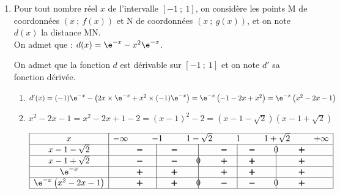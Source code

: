 \begin{enumerate}
\begin{enumerate}
	\end{enumerate}
\item  Pour tout nombre réel $x$ de l'intervalle $[-1~;~1]$, on considère les points M de coordonnées $(x~;~f(x))$ et N de coordonnées $(x~;~g(x))$, et on note $d(x)$ la distance MN. \\
On admet que : $d(x)= \e^{-x} - x^2\e^{-x}$.

On admet que la fonction $d$ est dérivable sur  $[-1~;~1]$ et on note $d'$ sa fonction dérivée.
	\begin{enumerate}
		\item %
$d'(x) = (-1) \e^{-x} - \left ( 2x \times \e^{-x} + x^2 \times (-1)\e^{-x}\right )
= \e^{-x} \left ( -1 -2x +x^2\right ) = \e^{-x} \left (x^2-2x-1\right )$
				
		\item%
$x^2-2x-1 = x^2-2x+1-2 = (x-1)^2-2 = \left ( x-1-\sqrt{2}\right )\left (x-1+\sqrt{2}\right )$

\begin{center}
{
\renewcommand{\arraystretch}{1.5}
\def\esp{\hspace*{0cm}}
$\begin{array}{|c | *{11}{c} |} 
\hline
x  & -\infty & \esp & -1 & \esp & 1-\sqrt{2} & \esp & 1 & \esp & 1+\sqrt{2} & \esp & +\infty \\
\hline
x-1-\sqrt{2} &  & \pmb{-} & \vline\hspace{-2.7pt}{\phantom 0} & \pmb{-} &  \vline\hspace{-2.7pt}{\phantom 0} & \pmb{-} & \vline\hspace{-2.7pt}{\phantom 0} & \pmb{-} &  \vline\hspace{-2.7pt}{0} & \pmb{+} &\\
\hline
x-1+\sqrt{2} &  & \pmb{-} & \vline\hspace{-2.7pt}{\phantom 0} & \pmb{-} &  \vline\hspace{-2.7pt}{0} & \pmb{+} & \vline\hspace{-2.7pt}{\phantom 0} & \pmb{+} &  \vline\hspace{-2.7pt}{\phantom 0} & \pmb{+} &\\
\hline
\e^{-x} &  & \pmb{+} & \vline\hspace{-2.7pt}{\phantom 0} & \pmb{+} &  \vline\hspace{-2.7pt}{\phantom 0} & \pmb{+} & \vline\hspace{-2.7pt}{\phantom 0} & \pmb{+} &  \vline\hspace{-2.7pt}{\phantom 0} & \pmb{+} &\\
\hline
\e^{-x} \left (x^2-2x-1\right )&  & \pmb{+} & \vline\hspace{-2.7pt}{\phantom 0} & \pmb{+} &  \vline\hspace{-2.7pt}{0} & \pmb{-} & \vline\hspace{-2.7pt}{\phantom 0} & \pmb{-} &  \vline\hspace{-2.7pt}{0} & \pmb{+} &\\
\hline
\end{array}$
}
\end{center}


\end{enumerate}
\end{enumerate}
